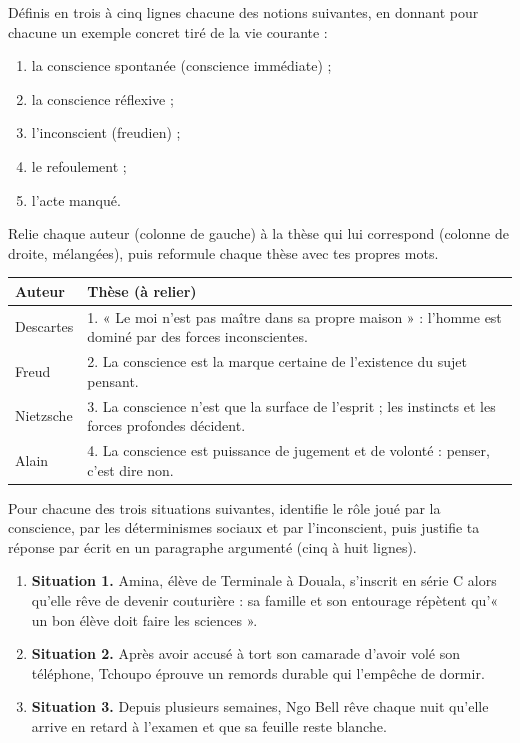 \documentclass[11pt]{article}
\newcounter{popsec}
\newcounter{popsub}
\newcommand{\courssub}[1]{%
  \stepcounter{popsub}%
  \par\vspace{9pt}\noindent{\popxbold\fontsize{11.5}{13}\selectfont\color{popink}{\color{poporange}\thepopsec.\thepopsub}\hspace{6pt}#1}\par\nopagebreak\vspace{4pt}
}
\begin{document}
\begin{exercice}[Définitions]
Définis en trois à cinq lignes chacune des notions suivantes, en donnant pour chacune un exemple concret tiré de la vie courante :
\begin{enumerate}
\item la conscience spontanée (conscience immédiate) ;
\item la conscience réflexive ;
\item l'inconscient (freudien) ;
\item le refoulement ;
\item l'acte manqué.
\end{enumerate}
\end{exercice}

\begin{exercice}
Relie chaque auteur (colonne de gauche) à la thèse qui lui correspond (colonne de droite, mélangées), puis reformule chaque thèse avec tes propres mots.
\begin{center}
\begin{tabularx}{\linewidth}{|l|X|}
\hline
\rowcolor{popblueL} \textbf{Auteur} & \textbf{Thèse (à relier)} \\
\hline
Descartes & 1. « Le moi n'est pas maître dans sa propre maison » : l'homme est dominé par des forces inconscientes. \\
\hline
Freud & 2. La conscience est la marque certaine de l'existence du sujet pensant. \\
\hline
Nietzsche & 3. La conscience n'est que la surface de l'esprit ; les instincts et les forces profondes décident. \\
\hline
Alain & 4. La conscience est puissance de jugement et de volonté : penser, c'est dire non. \\
\hline
\end{tabularx}
\end{center}
\end{exercice}

\courssub{Je m'entraîne}

\begin{exercice}
Pour chacune des trois situations suivantes, identifie le rôle joué par la conscience, par les déterminismes sociaux et par l'inconscient, puis justifie ta réponse par écrit en un paragraphe argumenté (cinq à huit lignes).
\begin{enumerate}
\item \textbf{Situation 1.} Amina, élève de Terminale à Douala, s'inscrit en série C alors qu'elle rêve de devenir couturière : sa famille et son entourage répètent qu'« un bon élève doit faire les sciences ».
\item \textbf{Situation 2.} Après avoir accusé à tort son camarade d'avoir volé son téléphone, Tchoupo éprouve un remords durable qui l'empêche de dormir.
\item \textbf{Situation 3.} Depuis plusieurs semaines, Ngo Bell rêve chaque nuit qu'elle arrive en retard à l'examen et que sa feuille reste blanche.
\end{enumerate}
\end{exercice}
\end{document}
